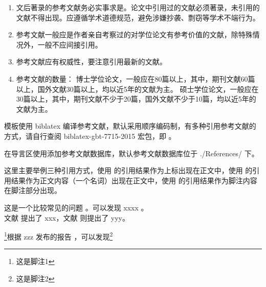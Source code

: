 \begin{tcolorbox}[colback=blue!5!white,colframe=blue!75!black]
  \begin{enumerate}[leftmargin=0.5cm]
    \item 文后著录的参考文献务必实事求是。论文中引用过的文献必须著录，未引用的文献不得出现。应遵循学术道德规范，避免涉嫌抄袭、剽窃等学术不端行为。
    \item 参考文献一般应是作者亲自考察过的对学位论文有参考价值的文献，除特殊情况外，一般不应间接引用。
    \item 参考文献应有权威性，要注意引用最新的文献。
    \item 参考文献的数量：
    博士学位论文，一般应在80篇以上，其中，期刊文献60篇以上，国外文献30篇以上，均以近5年的文献为主。
    硕士学位论文，一般应在30篇以上，其中，期刊文献不少于20篇，国外文献不少于10篇，均以近5年的文献为主。
  \end{enumerate}
\end{tcolorbox}

模板使用 biblatex 编译参考文献，默认采用顺序编码制，有多种引用参考文献的方式，请自行查阅 biblatex-gbt-7715-2015 宏包，即 。

在导言区使用\clist{}添加参考文献数据库，默认参考文献数据库位于 ./References/ 下。

这里主要举例三种引用方式，使用  的引用结果作为上标出现在正文中，使用  的引用结果作为正文内容（一个名词）出现在正文中，使用  的引用结果作为脚注内容在脚注部分出现。



\begin{texcode}[]{}
  这是一个比较常见的问题 \cite{barella_situ_2021}。可以发现 xxxx \cite{atta_enhanced_2021}。\\

  文献\parencite{张燕2013电气自动化在电气工程中的应用探讨} 提出了 xxx，文献 \parencite{黄雪芳2012探讨电气工程中自动化技术的应用} 则提出了 yyy。

\end{texcode}

\footnote{这是脚注1}根据 zzz 发布的报告 ，可以发现\footnote{这是脚注2}